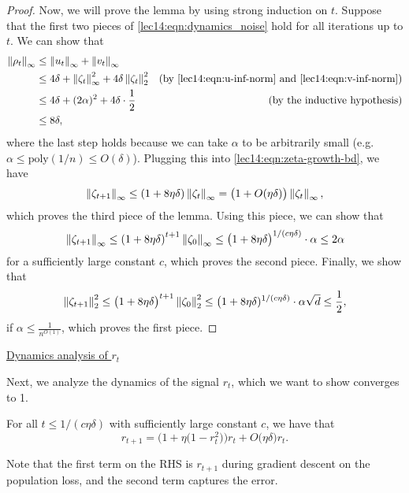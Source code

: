 \begin{proof}
Now, we will prove the lemma by using strong induction on $t$. Suppose that the first two pieces of \eqref{lec14:eqn:dynamics_noise} hold for all iterations up to $t$. We can show that
\begin{align}
\left\|\rho_{t}\right\|_{\infty} &\leq \left\|u_{t}\right\|_{\infty} + \left\|v_{t}\right\|_{\infty}  \\
&\leq 4\delta + \left\|\zeta_t\right\|_{\infty}^{2} + 4\delta \left\|\zeta_t\right\|_{2}^{2} &(\text{by \eqref{lec14:eqn:u-inf-norm} and \eqref{lec14:eqn:v-inf-norm}}) \\
&\leq  4\delta + (2\alpha)^2 + 4\delta \cdot \frac{1}{2} &(\text{by the inductive hypothesis})\\
\label{lec14:eqn:diff-inf-norm}
&\leq 8\delta,
\end{align}
where the last step holds because we can take $\alpha$ to be arbitrarily small (e.g. $\alpha \leq \text{poly}(1/n) \leq O(\delta)$). Plugging this into \eqref{lec14:eqn:zeta-growth-bd}, we have
\begin{equation}
\left\|\zeta_{t+1}\right\|_\infty \leq (1 + 8\eta \delta) \left\|\zeta_t\right\|_{\infty} = \big(1 + O(\eta\delta)\big) \left\|\zeta_t\right\|_\infty,
\end{equation}
which proves the third piece of the lemma. Using this piece, we can show that
\begin{equation}
\left\|\zeta_{t+1}\right\|_{\infty} \leq \left(1 + 8 \eta \delta\right)^{t+1} \left\|\zeta_{0}\right\|_{\infty} \leq \big(1 + 8\eta \delta\big) ^{1/(c\eta \delta)} \cdot \alpha  \leq 2\alpha
\end{equation}
for a sufficiently large constant $c$, which proves the second piece. Finally, we show that
\begin{equation}
\left\|\zeta_{t+1}\right\|_{2}^2 \leq \big(1 + 8\eta \delta\big)^{t+1}\left\|\zeta_{0}\right\|_{2}^2 \leq \big(1 + 8\eta \delta)^{1/(c\eta \delta)} \cdot \alpha \sqrt{d} \leq \frac{1}{2},
\end{equation}
if $\alpha \leq \frac{1}{n^{O(1)}}$, which proves the first piece.

\end{proof}

\underline{Dynamics analysis of $r_t$}

Next, we analyze the dynamics of the signal $r_t$, which we want to show converges to 1.

\begin{lemma} \label{lec14:lem:dynamics_signal}
    For all $t\leq 1 / (c\eta\delta)$ with sufficiently large constant $c$, we have that
    \[ r_{t+1} = \big(1 + \eta\big( 1 - r_t^2 \big) \big) r_t + O\big(\eta\delta\big) r_t. \]
\end{lemma}
Note that the first term on the RHS is $r_{t+1}$ during gradient descent on the population loss, and the second term captures the error.

